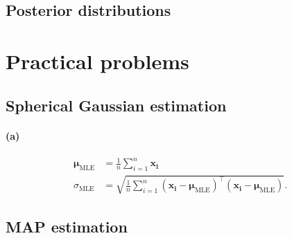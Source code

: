 \documentclass[a4paper,11pt]{article}
\begin{document}
\subsection{Posterior distributions}
\section{Practical problems}
\subsection{Spherical Gaussian estimation}
\paragraph{(a)}
\begin{align*}
\boldsymbol\mu_\textrm{MLE}&=\frac{1}{n}\sum_{i=1}^n\mathbf{x_i}\\
\sigma_\textrm{MLE}&=\sqrt{\frac{1}{n}\sum_{i=1}^n(\mathbf{x_i}-\boldsymbol\mu_\textrm{MLE})^\top(\mathbf{x_i}-\boldsymbol\mu_\textrm{MLE})}.
\end{align*}
\subsection{MAP estimation}
\end{document}

